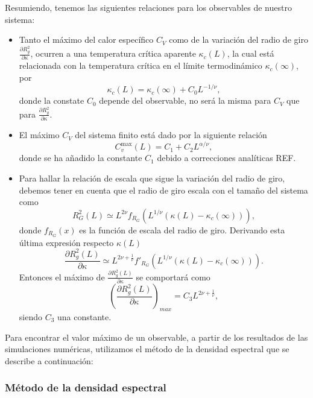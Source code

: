 Resumiendo, tenemos las siguientes relaciones para los observables de nuestro sistema:
\begin{itemize}
\item Tanto el máximo del calor específico $C_V$ como de la variación del
  radio de giro $\frac{\partial R_g^2}{\partial \kappa}$, ocurren a una temperatura crítica
  aparente $\kappa_c(L)$, la cual está relacionada con la temperatura crítica
  en el límite termodinámico $\kappa_c(\infty)$, por
  \begin{equation}
    \kappa_c(L)=\kappa_c(\infty)+C_0 L^{-1/\nu},
  \end{equation}
  donde la constate $C_0$ depende del observable, no será la misma para $C_V$
  que para $\frac{\partial R_g^2}{\partial \kappa}$.
\item El máximo $C_V$ del sistema finito está dado por la siguiente relación 
  \begin{equation}
    C^{\max}_v(L)=C_1+C_2L^{\alpha/\nu},
  \end{equation}
  donde se ha añadido la constante $C_1$ debido a correcciones analíticas
  REF. 
\item Para hallar la relación de escala que sigue la variación del radio de
  giro, debemos tener en cuenta que el radio de giro escala con el tamaño del
  sistema como
  \begin{equation}
    R^2_G(L)\simeq L^{2\nu}f_{R_G}(L^{1/\nu}(\kappa(L)-\kappa_c(\infty))),
  \end{equation}
  donde $f_{R_G}(x)$ es la función de escala del radio de giro. Derivando esta
  última expresión respecto $\kappa(L)$
  \begin{equation}
    \frac{\partial R_g^2(L)}{\partial \kappa}\simeq L^{2\nu+\frac{1}{\nu}}f'_{R_G}(L^{1/\nu}(\kappa(L)-\kappa_c(\infty))).
  \end{equation}
  Entonces el máximo de $\frac{\partial R_g^2(L)}{\partial \kappa}$ se
  comportará como
  \begin{equation}
    \left( \frac{\partial R_g^2(L)}{\partial \kappa}\right)_{max}=C_3  L^{2\nu+\frac{1}{\nu}},
  \end{equation}
  siendo $C_3$ una constante.
\end{itemize}

Para encontrar el valor máximo de un observable, a partir de los resultados de
las simulaciones numéricas, utilizamos el método de la densidad espectral que
se describe a continuación:

\subsubsection{Método de la densidad espectral}


